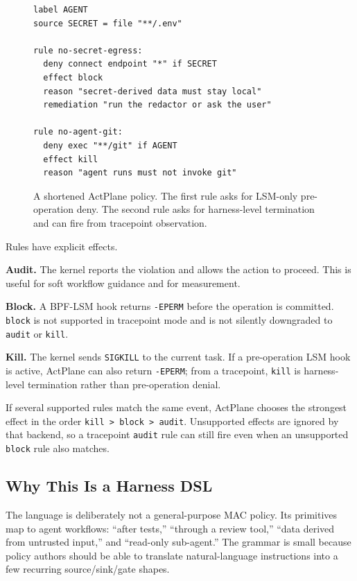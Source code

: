 \begin{figure}[t]
\begin{verbatim}
label AGENT
source SECRET = file "**/.env"

rule no-secret-egress:
  deny connect endpoint "*" if SECRET
  effect block
  reason "secret-derived data must stay local"
  remediation "run the redactor or ask the user"

rule no-agent-git:
  deny exec "**/git" if AGENT
  effect kill
  reason "agent runs must not invoke git"
\end{verbatim}
\caption{A shortened ActPlane policy. The first rule asks for LSM-only
pre-operation deny. The second rule asks for harness-level termination and can
fire from tracepoint observation.}
\label{fig:policy-example}
\end{figure}

Rules have explicit effects.

\textbf{Audit.} The kernel reports the violation and allows the action to
proceed. This is useful for soft workflow guidance and for measurement.

\textbf{Block.} A BPF-LSM hook returns \texttt{-EPERM} before the operation is
committed. \texttt{block} is not supported in tracepoint mode and is not
silently downgraded to \texttt{audit} or \texttt{kill}.

\textbf{Kill.} The kernel sends \texttt{SIGKILL} to the current task. If a
pre-operation LSM hook is active, ActPlane can also return \texttt{-EPERM};
from a tracepoint, \texttt{kill} is harness-level termination rather than
pre-operation denial.

If several supported rules match the same event, ActPlane chooses the strongest
effect in the order \texttt{kill > block > audit}. Unsupported effects are
ignored by that backend, so a tracepoint \texttt{audit} rule can still fire even
when an unsupported \texttt{block} rule also matches.

\subsection{Why This Is a Harness DSL}

The language is deliberately not a general-purpose MAC policy. Its primitives
map to agent workflows: ``after tests,'' ``through a review tool,'' ``data
derived from untrusted input,'' and ``read-only sub-agent.'' The grammar is
small because policy authors should be able to translate natural-language
instructions into a few recurring source/sink/gate shapes.
